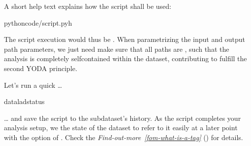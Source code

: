 \sphinxAtStartPar
A short help text explains how the script shall be used:

\begin{sphinxVerbatim}[commandchars=\\\{\}]
pythoncode/script.py\PYGZhy{}h



\end{sphinxVerbatim}

\sphinxAtStartPar
The script execution would thus be .
When parametrizing the input and output path parameters, we just need make sure that all paths  are , such that the  analysis is completely self\sphinxhyphen{}contained within the dataset, contributing to fulfill the second YODA principle.

\sphinxAtStartPar
Let’s run a quick …

\begin{sphinxVerbatim}[commandchars=\\\{\}]
dataladstatus
\end{sphinxVerbatim}

\ignorespaces 
\sphinxAtStartPar
… and save the script to the subdataset’s history. As the script completes your
analysis setup, we  the state of the dataset to refer to it easily at a later
point with the  option of . Check the
\textit{Find-out-more}~{\findoutmoreiconinline}\textit{\ref{fom-what-is-a-tag}} {\hyperref[\detokenize{basics/101-130-yodaproject:fom-what-is-a-tag}]{}} () for details.

